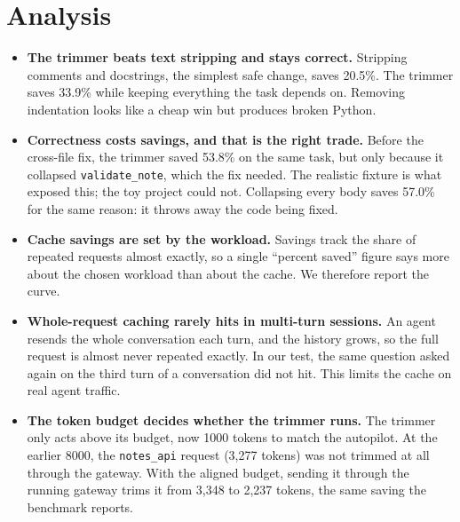 \documentclass[12pt, a4paper, oneside]{report}
\newcommand{\code}[1]{\texttt{#1}}
\begin{document}
\section{Analysis}

\begin{itemize}
    \item \textbf{The trimmer beats text stripping and stays correct.} Stripping
          comments and docstrings, the simplest safe change, saves 20.5\%. The
          trimmer saves 33.9\% while keeping everything the task depends on.
          Removing indentation looks like a cheap win but produces broken Python.
    \item \textbf{Correctness costs savings, and that is the right trade.} Before
          the cross-file fix, the trimmer saved 53.8\% on the same task, but only
          because it collapsed \code{validate\_note}, which the fix needed. The
          realistic fixture is what exposed this; the toy project could not.
          Collapsing every body saves 57.0\% for the same reason: it throws away
          the code being fixed.
    \item \textbf{Cache savings are set by the workload.} Savings track the share
          of repeated requests almost exactly, so a single ``percent saved'' figure
          says more about the chosen workload than about the cache. We therefore
          report the curve.
    \item \textbf{Whole-request caching rarely hits in multi-turn sessions.} An
          agent resends the whole conversation each turn, and the history grows,
          so the full request is almost never repeated exactly. In our test, the
          same question asked again on the third turn of a conversation did not
          hit. This limits the cache on real agent traffic.
    \item \textbf{The token budget decides whether the trimmer runs.} The trimmer
          only acts above its budget, now 1000 tokens to match the autopilot. At
          the earlier 8000, the \code{notes\_api} request (3,277 tokens) was not
          trimmed at all through the gateway. With the aligned budget, sending it
          through the running gateway trims it from 3,348 to 2,237 tokens, the
          same saving the benchmark reports.
\end{itemize}

\end{document}
